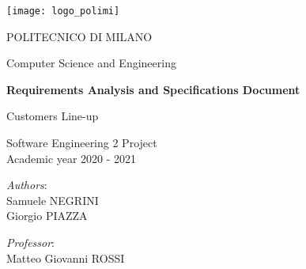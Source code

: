 \begin{titlingpage}
	\begin{center}
		\texttt{[image: logo\_polimi]}
		
		\vspace{0.25cm}
		
		\LARGE POLITECNICO DI MILANO\\
		
		\vspace{0.2cm}
		
		\Large Computer Science and Engineering
		
		\vspace{0.8cm}
	
		\Huge \textbf{Requirements Analysis and Specifications Document}
		
		\vspace{0.5cm}
		\huge Customers Line-up
		
		\vspace{1.5cm}
		\LARGE Software Engineering 2 Project\\
		\Large Academic year 2020 - 2021
		
		\vspace{3cm}
		
		\large
		\begin{minipage}{.1\textwidth}
			\null
		\end{minipage}%
		\begin{minipage}{.4\textwidth}
			\textit{Authors}:\\
			Samuele NEGRINI\\
			Giorgio PIAZZA
		\end{minipage}%
		\begin{minipage}{.4\textwidth}
			\raggedleft	
			\textit{Professor}:\\
			Matteo Giovanni ROSSI\\
			\phantom{placeholder}
		\end{minipage}%
		\begin{minipage}{.1\textwidth}
			\null
		\end{minipage}
	
			
		\end{center}
\end{titlingpage}